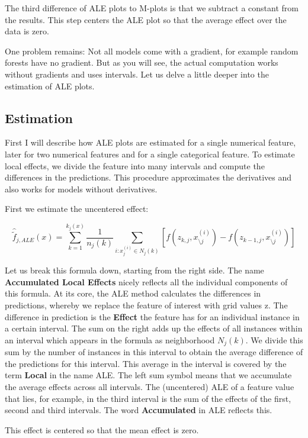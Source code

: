 \documentclass[12pt,]{krantz}
\begin{document}
The third difference of ALE plots to M-plots is that we subtract a
constant from the results. This step centers the ALE plot so that the
average effect over the data is zero.

One problem remains: Not all models come with a gradient, for example
random forests have no gradient. But as you will see, the actual
computation works without gradients and uses intervals. Let us delve a
little deeper into the estimation of ALE plots.

\subsection{Estimation}\label{estimation}

First I will describe how ALE plots are estimated for a single numerical
feature, later for two numerical features and for a single categorical
feature. To estimate local effects, we divide the feature into many
intervals and compute the differences in the predictions. This procedure
approximates the derivatives and also works for models without
derivatives.

First we estimate the uncentered effect:

\[\hat{\tilde{f}}_{j,ALE}(x)=\sum_{k=1}^{k_j(x)}\frac{1}{n_j(k)}\sum_{i:x_{j}^{(i)}\in{}N_j(k)}\left[f(z_{k,j},x^{(i)}_{\setminus{}j})-f(z_{k-1,j},x^{(i)}_{\setminus{}j})\right]\]

Let us break this formula down, starting from the right side. The name
\textbf{Accumulated Local Effects} nicely reflects all the individual
components of this formula. At its core, the ALE method calculates the
differences in predictions, whereby we replace the feature of interest
with grid values z. The difference in prediction is the \textbf{Effect}
the feature has for an individual instance in a certain interval. The
sum on the right adds up the effects of all instances within an interval
which appears in the formula as neighborhood \(N_j(k)\). We divide this
sum by the number of instances in this interval to obtain the average
difference of the predictions for this interval. This average in the
interval is covered by the term \textbf{Local} in the name ALE. The left
sum symbol means that we accumulate the average effects across all
intervals. The (uncentered) ALE of a feature value that lies, for
example, in the third interval is the sum of the effects of the first,
second and third intervals. The word \textbf{Accumulated} in ALE
reflects this.

This effect is centered so that the mean effect is zero.
\end{document}
